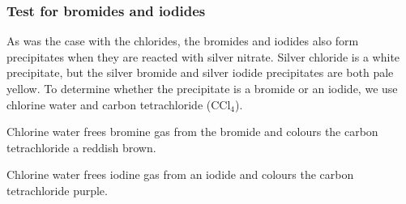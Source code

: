             \subsubsection{ Test for bromides and iodides}
            \nopagebreak
        \label{m38719*id341894}As was the case with the chlorides, the bromides and iodides also form precipitates when they are reacted with silver nitrate. Silver chloride is a white precipitate, but the silver bromide and silver iodide precipitates are both pale yellow. To determine whether the precipitate is a bromide or an iodide, we use chlorine water and carbon tetrachloride (${\mathrm{CCl}}_{4}$).\par 
        \label{m38719*id341914}Chlorine water frees bromine gas from the bromide and colours the carbon tetrachloride a reddish brown.\par 
        \label{m38719*id341920}Chlorine water frees iodine gas from an iodide and colours the carbon tetrachloride purple.\par 
\label{m38719*secfhsst!!!underscore!!!id1016}
